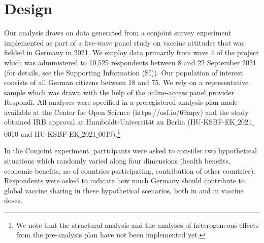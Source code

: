 \documentclass[12pt,oneside]{article}
\begin{document}

\section*{Design}
\label{sec:design}


Our analysis draws on data generated from a conjoint survey experiment implemented as part of a five-wave panel study on vaccine attitudes that was fielded in Germany in 2021. We employ data primarily from wave 4 of the project which was administered to 10,525 respondents between 8 and 22 September 2021 (for details, see the Supporting Information (SI)). Our population of interest consists of all German citizens between 18 and 75. We rely on a representative sample which was drawn with the help of the online-access panel provider \hspace{0pt}Respondi\hspace{0pt}\hspace{0pt}. All analyses were specified in a preregistered analysis plan made available at the Center for Open Science (https://osf.io/69mpy) and the study obtained IRB approval at Humboldt-Universität zu Berlin (HU-KSBF-EK$\_$2021$\_$0010 and HU-KSBF-EK$\_$2021$\_$0019).\footnote{We note that the structural analysis and the analyses of heterogeneous effects from the pre-analysis plan have not been implemented yet.}



In the Conjoint experiment, participants were asked to consider two hypothetical situations which randomly varied along four dimensions (health benefits, economic benefits, no of countries participating, contribution of other countries). Respondents were asked to indicate how   much Germany should contribute to global vaccine sharing in these hypothetical scenarios, both in \texteuro  and in vaccine doses.
\end{document}
